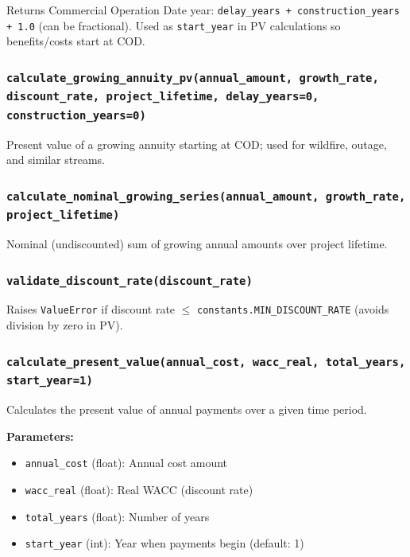 \documentclass[ctcc_full_documentation.tex]{subfiles}
\begin{document}
Returns Commercial Operation Date year: \texttt{delay\_years + construction\_years + 1.0} (can be fractional). Used as \texttt{start\_year} in PV calculations so benefits/costs start at COD.

\subsubsection{\texttt{calculate\_growing\_annuity\_pv(annual\_amount, growth\_rate, discount\_rate, project\_lifetime, delay\_years=0, construction\_years=0)}}

Present value of a growing annuity starting at COD; used for wildfire, outage, and similar streams.

\subsubsection{\texttt{calculate\_nominal\_growing\_series(annual\_amount, growth\_rate, project\_lifetime)}}

Nominal (undiscounted) sum of growing annual amounts over project lifetime.

\subsubsection{\texttt{validate\_discount\_rate(discount\_rate)}}

Raises \texttt{ValueError} if discount rate $\le$ \texttt{constants.MIN\_DISCOUNT\_RATE} (avoids division by zero in PV).

\subsubsection{\texttt{calculate\_present\_value(annual\_cost, wacc\_real, total\_years, start\_year=1)}}

Calculates the present value of annual payments over a given time period.

\textbf{Parameters:}
\begin{itemize}
    \item \texttt{annual\_cost} (float): Annual cost amount
    \item \texttt{wacc\_real} (float): Real WACC (discount rate)
    \item \texttt{total\_years} (float): Number of years
    \item \texttt{start\_year} (int): Year when payments begin (default: 1)
\end{itemize}
\end{document}
